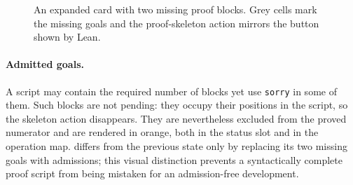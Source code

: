 \begin{figure}[ht!]
{%
  }
  \caption{An expanded card with two missing proof blocks.  Grey cells mark
    the missing goals and the proof-skeleton action mirrors the button shown by
    Lean.}
  \label{fig:barrel-state-missing}
\end{figure}
\FloatBarrier

\paragraph*{Admitted goals.}
A script may contain the required number of blocks yet use \texttt{sorry} in
some of them.  Such blocks are not pending: they occupy their positions in the
script, so the skeleton action disappears.  They are nevertheless excluded
from the proved numerator and are rendered in orange, both in the status slot
and in the operation map.   differs from the
previous state only by replacing its two missing goals with admissions; this
visual distinction prevents a syntactically complete proof script from being
mistaken for an admission-free development.

